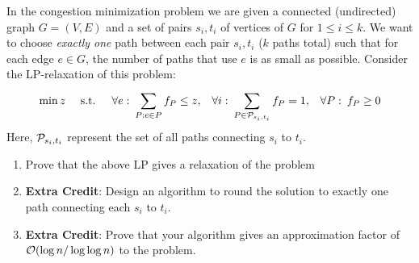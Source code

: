 \documentclass[10pt]{article}
\begin{document}
\begin{problem}[Problem 4]
    In the congestion minimization problem we are given a connected (undirected) graph \( G = (V,E) \) and a set of pairs \( s_i,t_i \) of vertices of \( G \) for \( 1\leq i\leq k \). We want to choose \textit{exactly one} path between each pair \( s_i,t_i \) (\(k\) paths total) such that for each edge \( e\in G \), the number of paths that use \( e \) is as small as possible. Consider the LP-relaxation of this problem:
    \begin{align*}
        \min z 
        &&\text{ s.t. } 
        &&\forall e: \:\sum_{P:e\in P}^{} f_P \leq z, 
        &&\forall i: \:\sum_{P\in \mathcal{P}_{s_i,t_i}}^{} f_P = 1,
        &&\forall P: \:f_P\geq 0
    \end{align*}
    Here, \( \mathcal{P}_{s_i,t_i} \) represent the set of all paths connecting \( s_i \) to \( t_i \).
    \begin{enumerate}[nolistsep]
        \item Prove that the above LP gives a relaxation of the problem
        \item \textbf{Extra Credit}: Design an algorithm to round the solution to exactly one path connecting each \( s_i \) to \( t_i \).
        \item \textbf{Extra Credit}: Prove that your algorithm gives an approximation factor of \\\( \mathcal{O}(\log n/ \log \log n ) \) to the problem.
    \end{enumerate}
\end{problem}
\end{document}
